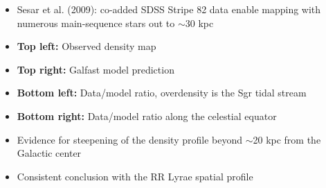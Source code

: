 \documentclass[letterpaper,landscape]{slides}
\begin{document}
\begin{slide}
{\begin{minipage}[t]{14cm}
\begin{itemize}
\item Sesar et al. (2009): co-added SDSS Stripe 82 data enable 
  mapping with numerous main-sequence stars out to $\sim$30 kpc
\item {\bf Top left:} Observed density map
\item {\bf Top right:} Galfast model prediction
\item {\bf Bottom left:} Data/model ratio, overdensity is the Sgr tidal stream
\item {\bf Bottom right:} Data/model ratio along the celestial equator
\item {\color{blue} Evidence for steepening of the density profile beyond 
    $\sim$20 kpc from the Galactic center}
\item Consistent conclusion with the RR Lyrae spatial profile
\end{itemize}     

\end{minipage}}
\vfill 
\end{slide}
\end{document}
